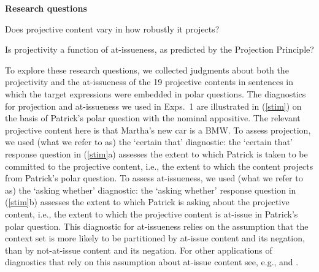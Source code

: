 \documentclass[11pt,fleqn]{article}
\newcommand{\6}{\mbox{$[\hspace*{-.6mm}[$}}
\newcommand{\9}{\mbox{$]\hspace*{-.6mm}]$}}
\begin{document}
\begin{exe}
\exi{(\ref{questions})} {\bf Research questions}

\begin{xlist} 

\ex Does projective content vary in how robustly it projects?

\ex Is projectivity a function of at-issueness, as predicted by the Projection Principle?
\end{xlist}

\end{exe} 
To explore these research questions, we collected judgments about both the projectivity and the at-issueness of the 19 projective contents in sentences in which the target expressions were embedded in polar questions. The diagnostics for projection and at-issueness we used in Exps.~1 are illustrated in (\ref{stim}) on the basis of Patrick's polar question with the nominal appositive. The relevant projective content here is that Martha's new car is a BMW. To assess projection, we used (what we refer to as) the `certain that' diagnostic: the `certain that' response question in (\ref{stim}a) assesses the extent to which Patrick is taken to be committed to the projective content, i.e., the extent to which the content projects from Patrick's polar question. To assess at-issueness, we used (what we refer to as) the `asking whether' diagnostic: the `asking whether' response question in (\ref{stim}b) assesses the extent to which Patrick is asking about the projective content, i.e., the extent to which the projective content is at-issue in Patrick's polar question. This diagnostic for at-issueness relies on the assumption that the context set is more likely to be partitioned by at-issue content and its negation, than by not-at-issue content and its negation. For other applications of diagnostics that rely on this assumption about at-issue content see, e.g., \citealt{amaral-etal07} and \citealt{tonhauser-sula6}.
\end{document}
